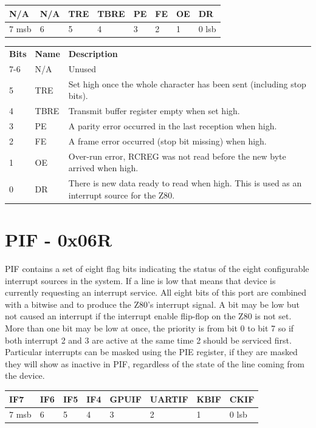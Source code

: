 \documentclass[a4paper,10pt]{book}
\begin{document}
\noindent
\begin{tabularx}{\textwidth}{ | X | X | X | X | X | X | X | X | }
 \hline
 N/A&N/A&TRE&TBRE&PE&FE&OE&DR\\
 \hline
 7 msb&6&5&4&3&2&1&0 lsb\\
 \hline
\end{tabularx}
\vspace{12pt}

\noindent
\begin{tabular}{llp{7cm}}
 \textbf{Bits}&\textbf{Name}&\textbf{Description}\\
 7-6&N/A&Unused\\
 5&TRE&Set high once the whole character has been sent (including stop bits).\\
 4&TBRE&Transmit buffer register empty when set high.\\
 3&PE&A parity error occurred in the last reception when high.\\
 2&FE&A frame error occurred (stop bit missing) when high.\\
 1&OE&Over-run error, RCREG was not read before the new byte arrived when high.\\
 0&DR&There is new data ready to read when high.  This is used as an interrupt source for the Z80.\\
\end{tabular}


\section{PIF - 0x06R}
PIF contains a set of eight flag bits indicating the status of the eight configurable interrupt sources in the system.  If a line is low that means that device is currently requesting an interrupt service.  All eight bits of this port are combined with a bitwise and to produce the Z80's interrupt signal.  A bit may be low but not caused an interrupt if the interrupt enable flip-flop on the Z80 is not set.  More than one bit may be low at once, the priority is from bit 0 to bit 7 so if both interrupt 2 and 3 are active at the same time 2 should be serviced first.  Particular interrupts can be masked using the PIE register, if they are masked they will show as inactive in PIF, regardless of the state of the line coming from the device.
\vspace{12pt}

\noindent
\begin{tabularx}{\textwidth}{| X | X | X | X | X | X | X | X |}
 \hline
  IF7&IF6&IF5&IF4&GPUIF&UARTIF&KBIF&CKIF\\
 \hline
  7 msb&6&5&4&3&2&1&0 lsb\\
 \hline
\end{tabularx}
\vspace{12pt}
\end{document}
